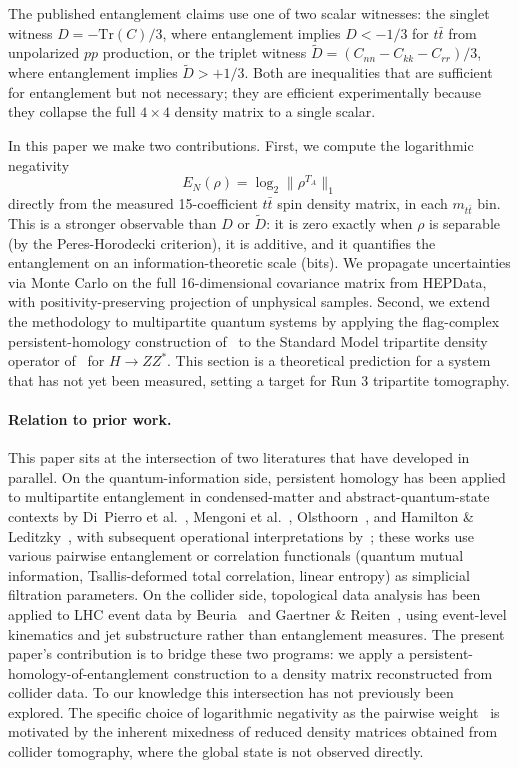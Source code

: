 \documentclass[11pt,a4paper]{article}
\theoremstyle{definition}
\begin{document}
The published entanglement claims use one of two scalar witnesses: the singlet witness $D = -\text{Tr}(C)/3$, where entanglement implies $D < -1/3$ for $t\bar{t}$ from unpolarized $pp$ production, or the triplet witness $\tilde{D} = (C_{nn} - C_{kk} - C_{rr})/3$, where entanglement implies $\tilde{D} > +1/3$. Both are inequalities that are sufficient for entanglement but not necessary; they are efficient experimentally because they collapse the full $4 \times 4$ density matrix to a single scalar.

In this paper we make two contributions. First, we compute the logarithmic negativity
\begin{equation}
E_N(\rho) = \log_2 \lVert \rho^{T_A} \rVert_1
\end{equation}
directly from the measured 15-coefficient $t\bar{t}$ spin density matrix, in each $m_{t\bar{t}}$ bin. This is a stronger observable than $D$ or $\tilde{D}$: it is zero exactly when $\rho$ is separable (by the Peres-Horodecki criterion), it is additive, and it quantifies the entanglement on an information-theoretic scale (bits). We propagate uncertainties via Monte Carlo on the full 16-dimensional covariance matrix from HEPData, with positivity-preserving projection of unphysical samples. Second, we extend the methodology to multipartite quantum systems by applying the flag-complex persistent-homology construction of~\cite{Scott2026RWF} to the Standard Model tripartite density operator of~\cite{AS2024} for $H \to ZZ^*$. This section is a theoretical prediction for a system that has not yet been measured, setting a target for Run 3 tripartite tomography.

\paragraph{Relation to prior work.} This paper sits at the intersection of two literatures that have developed in parallel. On the quantum-information side, persistent homology has been applied to multipartite entanglement in condensed-matter and abstract-quantum-state contexts by Di~Pierro et al.~\cite{DiPierro2018}, Mengoni et al.~\cite{Mengoni2019}, Olsthoorn~\cite{Olsthoorn2023}, and Hamilton \& Leditzky~\cite{HamiltonLeditzky2024}, with subsequent operational interpretations by~\cite{Spellman2025}; these works use various pairwise entanglement or correlation functionals (quantum mutual information, Tsallis-deformed total correlation, linear entropy) as simplicial filtration parameters. On the collider side, topological data analysis has been applied to LHC event data by Beuria~\cite{Beuria2023, Beuria2024} and Gaertner \& Reiten~\cite{GaertnerReiten2023}, using event-level kinematics and jet substructure rather than entanglement measures. The present paper's contribution is to bridge these two programs: we apply a persistent-homology-of-entanglement construction to a density matrix reconstructed from collider data. To our knowledge this intersection has not previously been explored. The specific choice of logarithmic negativity as the pairwise weight~\cite{Scott2026RWF} is motivated by the inherent mixedness of reduced density matrices obtained from collider tomography, where the global state is not observed directly.
\end{document}
